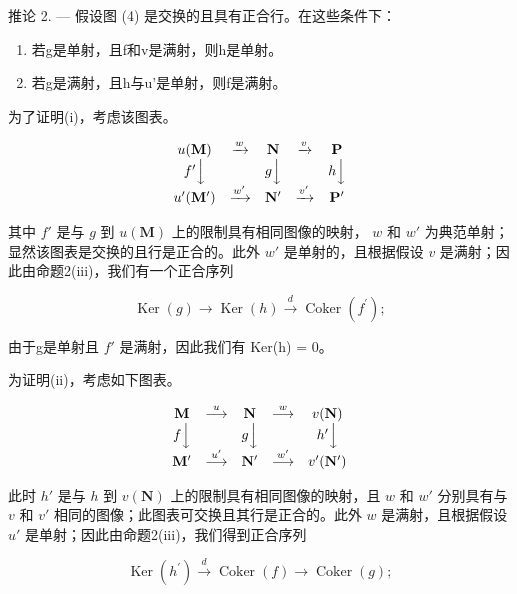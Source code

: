 推论 2. --- 假设图 (4) 是交换的且具有正合行。在这些条件下：

\begin{enumerate}
\def\labelenumi{(\roman{enumi})}
\item
  若g是单射，且f和v是满射，则h是单射。
\item
  若g是满射，且h与u'是单射，则f是满射。
\end{enumerate}

为了证明(i)，考虑该图表。

\[
\begin{array}{c c c c c} u (\mathbf {M}) & \xrightarrow {w} & \mathbf {N} & \xrightarrow {v} & \mathbf {P} \\ f ^ {\prime} \Big \downarrow & & g \Big \downarrow & & h \Big \downarrow \\ u ^ {\prime} (\mathbf {M} ^ {\prime}) & \xrightarrow {w ^ {\prime}} & \mathbf {N} ^ {\prime} & \xrightarrow {v ^ {\prime}} & \mathbf {P} ^ {\prime} \end{array}
\]

其中 \(f'\) 是与 \(g\) 到 \(u(\mathbf{M})\) 上的限制具有相同图像的映射， \(w\) 和 \(w'\) 为典范单射；显然该图表是交换的且行是正合的。此外 \(w'\) 是单射的，且根据假设 \(v\) 是满射；因此由命题2(iii)，我们有一个正合序列

\[
\operatorname{Ker} (g) \longrightarrow \operatorname{Ker} (h) \xrightarrow {d} \operatorname{Coker} \left(f ^ {\prime}\right);
\]

由于g是单射且 \(f'\) 是满射，因此我们有 Ker(h) = 0。

为证明(ii)，考虑如下图表。

\[
\begin{array}{c c c c c} \mathbf {M} & \stackrel {{u}} {{\longrightarrow}} & \mathbf {N} & \stackrel {{w}} {{\longrightarrow}} & v (\mathbf {N}) \\ f \Big \downarrow & & g \Big \downarrow & & h ^ {\prime} \Big \downarrow \\ \mathbf {M} ^ {\prime} & \stackrel {{u ^ {\prime}}} {{\longrightarrow}} & \mathbf {N} ^ {\prime} & \stackrel {{w ^ {\prime}}} {{\longrightarrow}} & v ^ {\prime} (\mathbf {N} ^ {\prime}) \end{array}
\]

此时 \(h'\) 是与 \(h\) 到 \(v(\mathbf{N})\) 上的限制具有相同图像的映射，且 \(w\) 和 \(w'\) 分别具有与 \(v\) 和 \(v'\) 相同的图像；此图表可交换且其行是正合的。此外 \(w\) 是满射，且根据假设 \(u'\) 是单射；因此由命题2(iii)，我们得到正合序列

\[
\operatorname{Ker} \left(h ^ {\prime}\right) \xrightarrow {d} \operatorname{Coker} (f) \longrightarrow \operatorname{Coker} (g);
\]

